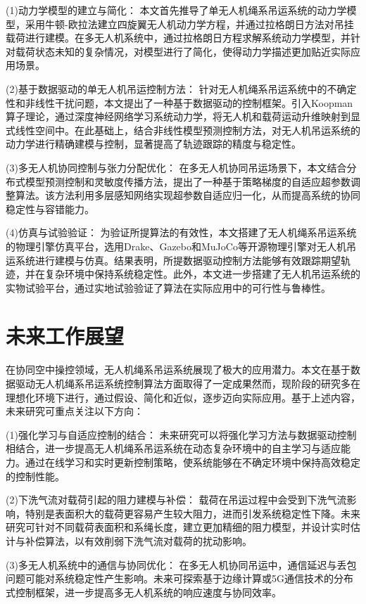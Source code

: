 \documentclass[lang=chs, degree=master, blindreview=true, winfonts=true]{yanputhesis}
\begin{document}
(1)动力学模型的建立与简化：
本文首先推导了单无人机绳系吊运系统的动力学模型，采用牛顿-欧拉法建立四旋翼无人机动力学方程，并通过拉格朗日方法对吊挂载荷进行建模。在多无人机系统中，通过拉格朗日方程求解系统动力学模型，并针对载荷状态未知的复杂情况，对模型进行了简化，使得动力学描述更加贴近实际应用场景。

(2)基于数据驱动的单无人机吊运控制方法：
针对无人机绳系吊运系统中的不确定性和非线性干扰问题，本文提出了一种基于数据驱动的控制框架。引入Koopman算子理论，通过深度神经网络学习系统动力学，将无人机和载荷运动升维映射到显式线性空间中。在此基础上，结合非线性模型预测控制方法，对无人机吊运系统的动力学进行精确建模与控制，显著提高了轨迹跟踪的精度与稳定性。

(3)多无人机协同控制与张力分配优化：
在多无人机协同吊运场景下，本文结合分布式模型预测控制和灵敏度传播方法，提出了一种基于策略梯度的自适应超参数调整算法。该方法利用多层感知网络实现超参数自适应归一化，从而提高系统的协同稳定性与容错能力。

(4)仿真与试验验证：
为验证所提算法的有效性，本文搭建了无人机绳系吊运系统的物理引擎仿真平台，选用Drake、Gazebo和MuJoCo等开源物理引擎对无人机吊运系统进行建模与仿真。结果表明，所提数据驱动控制方法能够有效跟踪期望轨迹，并在复杂环境中保持系统稳定性。此外，本文进一步搭建了无人机吊运系统的实物试验平台，通过实地试验验证了算法在实际应用中的可行性与鲁棒性。

\section{未来工作展望}
在协同空中操控领域，无人机绳系吊运系统展现了极大的应用潜力。本文在基于数据驱动无人机绳系吊运系统控制算法方面取得了一定成果然而，现阶段的研究多在理想化环境下进行，通过假设、简化和近似，逐步迈向实际应用。基于上述内容，未来研究可重点关注以下方向：

(1)强化学习与自适应控制的结合：
未来研究可以将强化学习方法与数据驱动控制相结合，进一步提高无人机绳系吊运系统在动态复杂环境中的自主学习与适应能力。通过在线学习和实时更新控制策略，使系统能够在不确定环境中保持高效稳定的控制性能。

(2)下洗气流对载荷引起的阻力建模与补偿：
载荷在吊运过程中会受到下洗气流影响，特别是表面积大的载荷更容易产生较大阻力，进而引发系统稳定性下降。未来研究可针对不同载荷表面积和系绳长度，建立更加精细的阻力模型，并设计实时估计与补偿算法，以有效削弱下洗气流对载荷的扰动影响。

(3)多无人机系统中的通信与协同优化：
在多无人机协同吊运中，通信延迟与丢包问题可能对系统稳定性产生影响。未来可探索基于边缘计算或5G通信技术的分布式控制框架，进一步提高多无人机系统的响应速度与协同效率。
\end{document}
